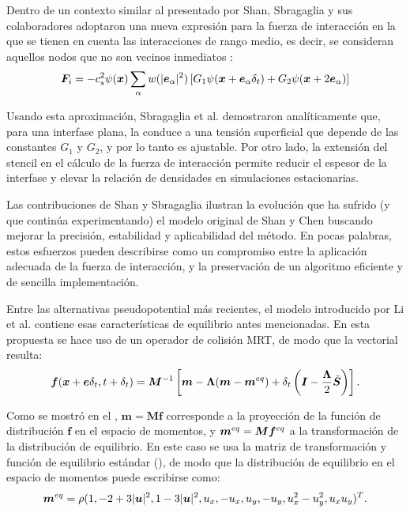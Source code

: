 Dentro de un contexto similar al presentado por Shan, Sbragaglia y sus colaboradores adoptaron una nueva expresi\'on para la fuerza de interacci\'on en la que se tienen en cuenta las interacciones de rango medio, es decir, se consideran aquellos nodos que no son vecinos inmediatos \cite{sbragaglia_generalized_2007}:
\begin{equation}
	\bm{F}_i = -c_s^2 \psi(\bm{x}) \sum_{\alpha} w(|\bm{e}_{\alpha}|^2) \left[G_1 \psi(\bm{x} + \bm{e}_{\alpha}\delta_t)  + G_2 \psi(\bm{x}+2\bm{e}_{\alpha}) \right]
	\label{eq:fi_sbragaglia}
\end{equation}

Usando esta aproximaci\'on, Sbragaglia et al. demostraron anal\'iticamente que, para una interfase plana, la  conduce a una tensi\'on superficial que depende de las constantes $G_1$ y $G_2$, y por lo tanto es ajustable. Por otro lado, la extensi\'on del stencil en el c\'alculo de la fuerza de interacci\'on permite reducir el espesor de la interfase y elevar la relaci\'on de densidades en simulaciones estacionarias.


Las contribuciones de Shan y Sbragaglia ilustran la evoluci\'on que ha sufrido (y que contin\'ua experimentando) el modelo original de Shan y Chen buscando mejorar la precisi\'on, estabilidad y aplicabilidad del m\'etodo. En pocas palabras, estos esfuerzos pueden describirse como un compromiso entre la aplicaci\'on adecuada de la fuerza de interacci\'on, y la preservaci\'on de un algoritmo eficiente y de sencilla implementaci\'on.

Entre las alternativas pseudopotential m\'as recientes, el modelo introducido por Li et al. \cite{li_lattice_2013} contiene esas caracter\'isticas de equilibrio antes mencionadas. En esta propuesta se hace uso de un operador de colisi\'on MRT, de modo que la \lbe{} vectorial resulta:
\begin{equation}
	\bm{f} (\bm{x} + \bm{e}\delta_t, t+\delta_t) = \bm{M}^{-1}\left[ \bm{m} - \bm{\Lambda}(\bm{m} - \bm{m}^{eq})  + \delta_t \left( \bm{I} - \dfrac{\bm{\Lambda}}{2} \bar{\bm{S}} \right) \right].
	\label{eq:lbe_li}
\end{equation}

Como se mostr\'o en el , $\bm{m} = \bm{Mf}$ corresponde a la proyecci\'on de la funci\'on de distribuci\'on $\bm{f}$ en el espacio de momentos, y $\bm{m}^{eq} = \bm{M}\bm{f}^{eq}$ a la transformaci\'on de la distribuci\'on de equilibrio. En este caso se usa la matriz de transformaci\'on y funci\'on de equilibrio est\'andar (), de modo que la distribuci\'on de equilibrio en el espacio de momentos puede escribirse como:
\begin{equation}
\bm{m}^{eq} = \rho (1, -2+3|\bm{u}|^2, 1-3|\bm{u}|^2, u_x, -u_x, u_y, -u_y, u_x^2-u_y^2, u_xu_y)^T.
\end{equation}

